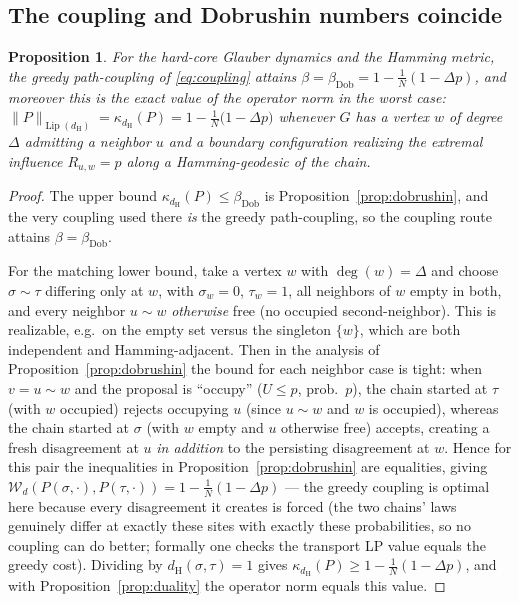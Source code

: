 \documentclass{amsart}
\newtheorem{proposition}{Proposition}
\DeclareMathOperator{\Lip}{Lip}
\newcommand{\Wd}{\mathcal{W}_d}
\begin{document}
\subsection{The coupling and Dobrushin numbers coincide}
\begin{proposition}\label{prop:equal}
For the hard-core Glauber dynamics and the Hamming metric, the greedy
path-coupling of \eqref{eq:coupling} attains
$\beta=\beta_{\mathrm{Dob}}=1-\tfrac1N(1-\Delta p)$, and moreover this is the
\emph{exact} value of the operator norm in the worst case:
$\|P\|_{\Lip(d_{\mathrm H})}=\kappa_{d_{\mathrm H}}(P)
=1-\tfrac1N\big(1-\Delta p\big)$ whenever $G$ has a vertex $w$ of degree
$\Delta$ admitting a neighbor $u$ and a boundary configuration realizing the
extremal influence $R_{u,w}=p$ along a Hamming-geodesic of the chain.
\end{proposition}
\begin{proof}
The upper bound $\kappa_{d_{\mathrm H}}(P)\le\beta_{\mathrm{Dob}}$ is
Proposition~\ref{prop:dobrushin}, and the very coupling used there \emph{is} the
greedy path-coupling, so the coupling route attains
$\beta=\beta_{\mathrm{Dob}}$.

For the matching lower bound, take a vertex $w$ with $\deg(w)=\Delta$ and choose
$\sigma\sim\tau$ differing only at $w$, with $\sigma_w=0$, $\tau_w=1$, all
neighbors of $w$ empty in both, and every neighbor $u\sim w$ \emph{otherwise}
free (no occupied second-neighbor). This is realizable, e.g.\ on the empty set
versus the singleton $\{w\}$, which are both independent and Hamming-adjacent.
Then in the analysis of Proposition~\ref{prop:dobrushin} the bound for each
neighbor case is tight: when $v=u\sim w$ and the proposal is ``occupy''
($U\le p$, prob.\ $p$), the chain started at $\tau$ (with $w$ occupied) rejects
occupying $u$ (since $u\sim w$ and $w$ is occupied), whereas the chain started at
$\sigma$ (with $w$ empty and $u$ otherwise free) accepts, creating a fresh
disagreement at $u$ \emph{in addition} to the persisting disagreement at $w$.
Hence for this pair the inequalities in Proposition~\ref{prop:dobrushin} are
equalities, giving
$\Wd(P(\sigma,\cdot),P(\tau,\cdot))=1-\tfrac1N(1-\Delta p)$ — the greedy coupling
is optimal here because every disagreement it creates is forced (the two chains'
laws genuinely differ at exactly these sites with exactly these probabilities, so
no coupling can do better; formally one checks the transport LP value equals the
greedy cost). Dividing by $d_{\mathrm H}(\sigma,\tau)=1$ gives
$\kappa_{d_{\mathrm H}}(P)\ge1-\tfrac1N(1-\Delta p)$, and with
Proposition~\ref{prop:duality} the operator norm equals this value.
\end{proof}
\end{document}
